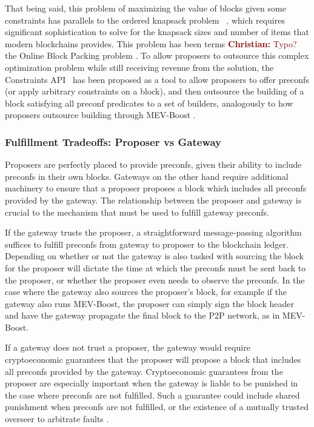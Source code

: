 \documentclass[a4paper]{article}
\theoremstyle{boldstyle}
\newcommand{\chm}[1]{\textcolor{Maroon}{\textbf{Christian:} #1}}
\begin{document}
That being said, this problem of maximizing the value of blocks given some constraints has parallels to the ordered knapsack problem ~\cite{P:Partiallyorderedknapsackandapplicationstoscheculing}, which requires significant sophistication to solve for the knapsack sizes and number of items that modern blockchains provides. This problem has been terms \chm{Typo?} the Online Block Packing problem \cite{OnlineBlockPacking}. To allow proposers to outsource this complex optimization problem while still receiving revenue from the solution, the Constraints API~\cite{W:ConstraintsAPISpecification} has been proposed as a tool to allow proposers to offer preconfs (or apply arbitrary constraints on a block), and then outsource the building of a block satisfying all preconf predicates to a set of builders, analogously to how proposers outsource building through MEV-Boost \cite{MEV-Boost}. 

\subsubsection{Fulfillment Tradeoffs: Proposer vs Gateway}
\label{delivery_tradeoffs}

Proposers are perfectly placed to provide preconfs, given their ability to include preconfs in their own blocks. Gateways on the other hand require additional machinery to ensure that a proposer proposes a block which includes all preconfs provided by the gateway. The relationship between the proposer and gateway is crucial to the mechanism that must be used to fulfill gateway preconfs. 

If the gateway trusts the proposer, a straightforward message-passing algorithm suffices to fulfill preconfs from gateway to proposer to the blockchain ledger. Depending on whether or not the gateway is also tasked with sourcing the block for the proposer will dictate the time at which the preconfs must be sent back to the proposer, or whether the proposer even needs to observe the preconfs. In the case where the gateway also sources the proposer's block, for example if the gateway also runs MEV-Boost, the proposer can simply sign the block header and have the gateway propagate the final block to the P2P network, as in MEV-Boost.

If a gateway does not trust a proposer, the gateway would require cryptoeconomic guarantees that the proposer will propose a block that includes all preconfs provided by the gateway. Cryptoeconomic guarantees from the proposer are especially important when the gateway is liable to be punished in the case where preconfs are not fulfilled. Such a guarantee could include shared punishment when preconfs are not fulfilled, or the existence of a mutually trusted overseer to arbitrate faults \cite{W:PreconfirmationFairExchange,W:FaultAttribution}. 
\end{document}

